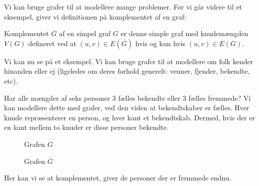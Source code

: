 Vi kan bruge grafer til at modellere mange problemer. Før vi går videre til et eksempel, giver vi definitionen på komplementet af en graf:
\begin{definition}
Komplementet $\overline{G}$ af en simpel graf $G$ er denne simple graf med knudemængden $V(G)$ defineret ved at $(u,v) \in E(\overline{G})$ hvis og kun hvis $(u,v) \in E(G)$.
\end{definition}

Vi kan nu se på et eksempel. Vi kan bruge grafer til at modellere om folk kender hinanden eller ej (ligeledes om deres forhold generelt: venner, fjender, bekendte, etc).


\begin{example}
  \label{ex:1.1.7}
Har alle mængder af seks personer 3 fælles bekendte eller 3 fælles fremmede? Vi kan modellere dette med grafer, ved den viden at bekendtskaber er fælles. Hver knude repræsenterer en person, og hver kant et bekendtskab. Dermed, hvis der er en kant mellem to knuder er disse personer bekendte.
\begin{figure}[H]
  \centering
  \begin{minipage}{0.45\textwidth}
    \centering
    \caption{\label{} Grafen $G$}
  \end{minipage}
  \hfill
  \begin{minipage}{0.45\textwidth}
    \centering
    \caption{Grafen $\overline{G}$}
  \end{minipage}
\end{figure}
  Her kan vi se at komplementet, giver de personer der er fremmede endnu.
\end{example}



